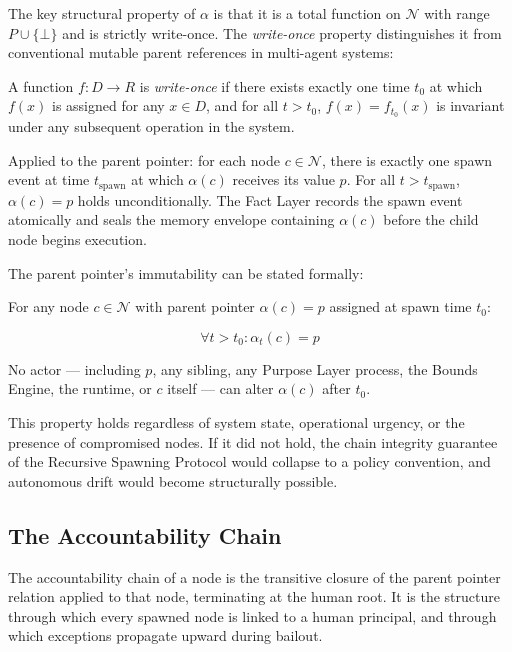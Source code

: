The key structural property of $\alpha$ is that it is a total function on $\mathcal{N}$ with range $P \cup \{\bot\}$ and is strictly write-once. The \emph{write-once} property distinguishes it from conventional mutable parent references in multi-agent systems:

\begin{dfn}
\label{dfn:write-once}
A function $f: D \rightarrow R$ is \emph{write-once} if there exists exactly one time $t_0$ at which $f(x)$ is assigned for any $x \in D$, and for all $t > t_0$, $f(x) = f_{t_0}(x)$ is invariant under any subsequent operation in the system.
\end{dfn}

Applied to the parent pointer: for each node $c \in \mathcal{N}$, there is exactly one spawn event at time $t_{\text{spawn}}$ at which $\alpha(c)$ receives its value $p$. For all $t > t_{\text{spawn}}$, $\alpha(c) = p$ holds unconditionally. The Fact Layer records the spawn event atomically and seals the memory envelope containing $\alpha(c)$ before the child node begins execution.

The parent pointer's immutability can be stated formally:

\begin{prop}
\label{prop:pp-immutable}
For any node $c \in \mathcal{N}$ with parent pointer $\alpha(c) = p$ assigned at spawn time $t_0$:

\[
\forall t > t_0: \alpha_t(c) = p
\]

No actor — including $p$, any sibling, any Purpose Layer process, the Bounds Engine, the runtime, or $c$ itself — can alter $\alpha(c)$ after $t_0$.
\end{prop}

This property holds regardless of system state, operational urgency, or the presence of compromised nodes. If it did not hold, the chain integrity guarantee of the Recursive Spawning Protocol would collapse to a policy convention, and autonomous drift would become structurally possible.

\subsection{The Accountability Chain}
\label{sec:accountability-chain}

The accountability chain of a node is the transitive closure of the parent pointer relation applied to that node, terminating at the human root. It is the structure through which every spawned node is linked to a human principal, and through which exceptions propagate upward during bailout.

